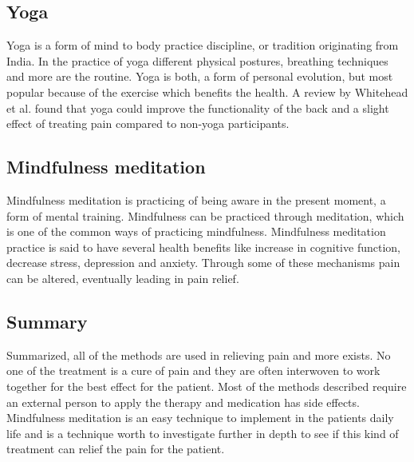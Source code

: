 \subsection{Yoga}
Yoga is a form of mind to body practice discipline, or tradition originating from India. In the practice of yoga different physical postures, breathing techniques and more are the routine. 
Yoga is both, a form of personal evolution, but most popular because of the exercise which benefits the health.
A review by Whitehead et al. \cite{Whitehead2017} found that yoga could improve the functionality of the back and a slight effect of treating pain compared to non-yoga participants. 

\subsection{Mindfulness meditation}
Mindfulness meditation is practicing of being aware in the present moment, a form of mental training. Mindfulness can be practiced through meditation, which is one of the common ways of practicing mindfulness. Mindfulness meditation practice is said to have several health benefits like increase in cognitive function, decrease stress, depression and anxiety. Through some of these mechanisms pain can be altered, eventually leading in pain relief. \cite{Zeidan2016} 

\subsection{Summary}
Summarized, all of the methods are used in relieving pain and more exists. No one of the treatment is a cure of pain and they are often interwoven to work together for the best effect for the patient. Most of the methods described require an external person to apply the therapy and medication has side effects. Mindfulness meditation is an easy technique to implement in the patients daily life and is a technique worth to investigate further in depth to see if this kind of treatment can relief the pain for the patient. 